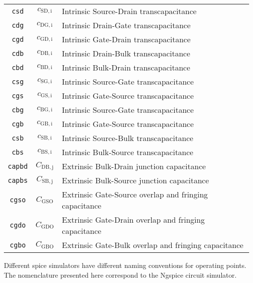 \documentclass{article}[11pt]
\begin{document}
\begin{table}[H]
\begin{tabular}{ccl}
\texttt{csd}         & $c_{\mathrm{SD,i}}$    & Intrinsic Source-Drain transcapacitance                \\ 
\texttt{cdg}         & $c_{\mathrm{DG,i}}$    & Intrinsic Drain-Gate transcapacitance                  \\ 
\texttt{cgd}         & $c_{\mathrm{GD,i}}$    & Intrinsic Gate-Drain transcapacitance                  \\ 
\texttt{cdb}         & $c_{\mathrm{DB,i}}$    & Intrinsic Drain-Bulk transcapacitance                  \\ 
\texttt{cbd}         & $c_{\mathrm{BD,i}}$    & Intrinsic Bulk-Drain transcapacitance                  \\ 
\texttt{csg}         & $c_{\mathrm{SG,i}}$    & Intrinsic Source-Gate transcapacitance                 \\ 
\texttt{cgs}         & $c_{\mathrm{GS,i}}$    & Intrinsic Gate-Source transcapacitance                 \\
\texttt{cbg}         & $c_{\mathrm{BG,i}}$    & Intrinsic Source-Gate transcapacitance                 \\
\texttt{cgb}         & $c_{\mathrm{GB,i}}$    & Intrinsic Gate-Source transcapacitance                 \\
\texttt{csb}         & $c_{\mathrm{SB,i}}$    & Intrinsic Source-Bulk transcapacitance                 \\
\texttt{cbs}         & $c_{\mathrm{BS,i}}$    & Intrinsic Bulk-Source transcapacitance                 \\
\texttt{capbd}       & $C_{\mathrm{DB,j}}$    & Extrinsic Bulk-Drain junction capacitance              \\
\texttt{capbs}       & $C_{\mathrm{SB,j}}$    & Extrinsic Bulk-Source junction capacitance             \\
\texttt{cgso}        & $C_{\mathrm{GSO}}$     & Extrinsic Gate-Source overlap and fringing capacitance \\
\texttt{cgdo}        & $C_{\mathrm{GDO}}$     & Extrinsic Gate-Drain overlap and fringing capacitance  \\
\texttt{cgbo}        & $C_{\mathrm{GBO}}$     & Extrinsic Gate-Bulk overlap and fringing capacitance   \\ \toprule
\end{tabular}
\label{tab:oppoints}
\end{table}

Different \gls{spice} simulators have different naming conventions for 
operating points.
The nomenclature presented here correspond to the Ngspice circuit simulator.
\end{document}
